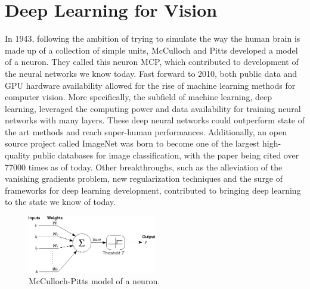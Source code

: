 \section{Deep Learning for Vision}\label{chap:2:machinelearning}
In 1943, following the ambition of trying to simulate the way the human brain is made up of a collection of simple units, McCulloch and Pitts \cite{mcculloch1943logical} developed a model of a neuron. They called this neuron MCP, which contributed to development of the neural networks we know today. Fast forward to 2010, both public data and GPU hardware availability allowed for the rise of machine learning methods for computer vision. More specifically, the subfield of machine learning, deep learning, leveraged the computing power and data availability for training neural networks with many layers. These deep neural networks could outperform state of the art methods and reach super-human performances. Additionally, an open source project called ImageNet \cite{deng2009imagenet} was born to become one of the largest high-quality public databases for image classification, with the paper  \cite{krizhevsky2017imagenet} being cited over 77000 times as of today. Other breakthroughs, such as the alleviation of the vanishing gradients problem, new regularization techniques and the surge of frameworks for deep learning development, contributed to bringing deep learning to the state we know of today.

\begin{figure}[!ht]
        \centering
        \includegraphics[width=0.5\textwidth]{images/mcculloch-pitts-model.png}
        \caption{McCulloch-Pitts model of a neuron.}
        \label{fig:cow_fmc}
    \end{figure}
    
